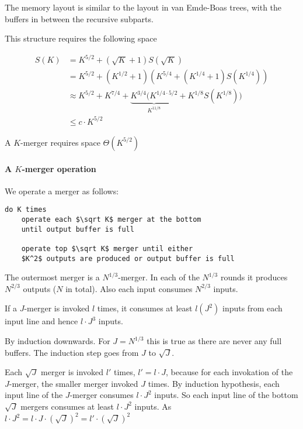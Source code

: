 The memory layout is similar to the layout in van Emde-Boas trees, with the buffers in between the recursive subparts. 

This structure requires the following space

\begin{align*}
S(K) &= K^{5/2} + (\sqrt K +1)S(\sqrt K)\\
	&= K^{5/2} + (K^{1/2}+1)(K^{5/4} + (K^{1/4}+1)S(K^{1/4}))\\
	&\approx K^{5/2} + K^{7/4} + \underbrace{K^{3/4}(K^{1/4\cdot 5/2}}_{K^{11/8}} + K^{1/8}S(K^{1/8}))\\
	&\leq c\cdot K^{5/2}
	\end{align*}
	
\begin{lem} A $K$-merger requires space $\Theta(K^{5/2})$\end{lem}

\paragraph{A $K$-merger operation} We operate a merger as follows:

\begin{lstlisting}
do K times
	operate each $\sqrt K$ merger at the bottom
	until output buffer is full
	
	operate top $\sqrt K$ merger until either
	$K^2$ outputs are produced or output buffer is full
\end{lstlisting}

The outermost merger is a $N^{1/3}$-merger. In each of the $N^{1/3}$ rounds it produces $N^{2/3}$ outputs ($N$ in total). Also each input consumes $N^{2/3}$ inputs.

\begin{lem}
If a $J$-merger is invoked $l$ times, it consumes at least $l(J^2)$ inputs from each input line and hence $l\cdot J^3$ inputs.
\end{lem}

\begin{pr} By induction downwards. For $J=N^{1/3}$ this is true as there are never any full buffers. The induction step goes from $J$ to $\sqrt{J}$. 

Each $\sqrt{J}$ merger is invoked $l'$ times, $l'=l\cdot J$, because for each invokation of the $J$-merger, the smaller merger invoked $J$ times. By induction hypothesis, each input line of the $J$-merger consumes $l\cdot J^2$ inputs. So each input line of the bottom $\sqrt J$ mergers consumes at least $l\cdot J^2$ inputs. As $l\cdot J^2 = l\cdot J \cdot (\sqrt{J})^2 = l'\cdot (\sqrt{J})^2$ 
\end{pr}

